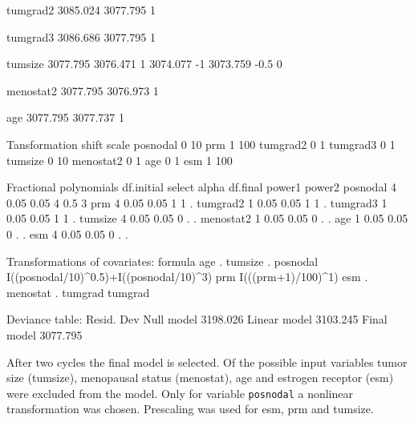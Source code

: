 \documentclass[11pt]{article}
\begin{document}
\begin{Schunk}
\begin{Soutput}
	tumgrad2	 	 	 
	        	3085.024	 
	        	3077.795	1
	        			 		
	        			 		

	tumgrad3	 	 	 
	        	3086.686	 
	        	3077.795	1
	        			 		
	        			 		

	tumsize	 	 	 	 
	        	3077.795	 
	        	3076.471	1
	        	3074.077	-1
	        	3073.759	-0.5 0

	menostat2	 	 	 
	        	3077.795	 
	        	3076.973	1
	        			 		
	        			 		

	age	 	 	 	 
	        	3077.795	 
	        	3077.737	1
	        			 		
	        			 		


Tansformation
          shift scale
posnodal      0    10
prm           1   100
tumgrad2      0     1
tumgrad3      0     1
tumsize       0    10
menostat2     0     1
age           0     1
esm           1   100

Fractional polynomials
          df.initial select alpha df.final power1 power2
posnodal           4   0.05  0.05        4    0.5      3
prm                4   0.05  0.05        1      1      .
tumgrad2           1   0.05  0.05        1      1      .
tumgrad3           1   0.05  0.05        1      1      .
tumsize            4   0.05  0.05        0      .      .
menostat2          1   0.05  0.05        0      .      .
age                1   0.05  0.05        0      .      .
esm                4   0.05  0.05        0      .      .


Transformations of covariates:
                                         formula
age                                            .
tumsize                                        .
posnodal I((posnodal/10)^0.5)+I((posnodal/10)^3)
prm                           I(((prm+1)/100)^1)
esm                                            .
menostat                                       .
tumgrad                                  tumgrad


Deviance table:
 		 Resid. Dev
Null model	 3198.026
Linear model	 3103.245
Final model	 3077.795
\end{Soutput}
\end{Schunk}

After two cycles the final model is selected. 
Of the possible input variables tumor size (tumsize), menopausal status (menostat), age and estrogen receptor (esm) were excluded from the model.
Only for variable \texttt{posnodal} a nonlinear transformation was chosen. 
Prescaling was used for esm, prm and tumsize.
\end{document}
